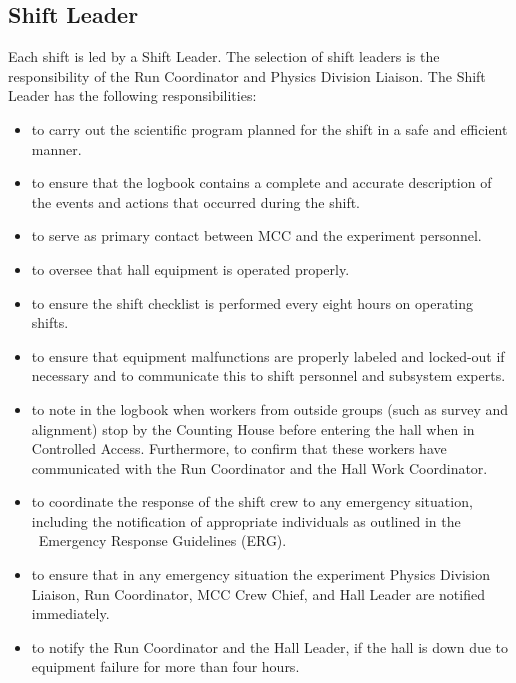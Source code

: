 \documentclass[11pt]{article}
\begin{document}
\subsection{Shift Leader}
\indent

Each shift is led by a Shift Leader. The selection of shift leaders
is the responsibility of the Run Coordinator and Physics Division Liaison.
The Shift Leader has the following responsibilities: 

\begin{itemize}

\item to carry out the scientific program planned for the shift in a safe
and efficient manner.

\item to ensure that the logbook contains a complete and accurate
description of the events and actions that occurred during the shift.

\item to serve as primary contact between MCC and the
experiment personnel.

\item  to oversee that hall equipment is operated properly.

\item to ensure the shift checklist is performed every eight hours on operating
shifts.

\item to ensure that equipment malfunctions are properly labeled and
locked-out if necessary and to communicate this to shift personnel and 
subsystem experts.

 \item to note in the logbook when workers from outside groups (such as survey 
and alignment) stop by the Counting House before entering the hall when in 
Controlled Access. Furthermore, to confirm that these workers have
communicated with the Run Coordinator and the Hall Work Coordinator.

\item to coordinate the response of the shift crew to any
emergency situation, including the notification of appropriate individuals as
outlined in the \HALL\ Emergency Response Guidelines (ERG).

\item  to ensure that in any emergency situation the 
experiment Physics Division Liaison, Run Coordinator, MCC Crew Chief, and Hall Leader 
are notified immediately.

\item to notify the Run Coordinator and the Hall Leader, if the hall is down due to equipment failure for more than four hours.


\end{itemize}
\end{document}
